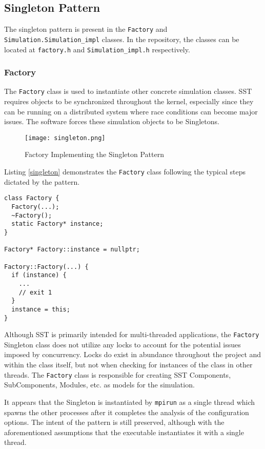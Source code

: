 \subsection{Singleton Pattern}
The singleton pattern is present in the \texttt{Factory} and \texttt{Simulation.Simulation\_impl} classes. In the repository, the classes can be located at \texttt{factory.h} and \texttt{Simulation\_impl.h} respectively.

\subsubsection{Factory}
The \texttt{Factory} class is used to instantiate other concrete simulation classes. SST requires objects to be synchronized throughout the kernel, especially since they can be running on a distributed system where race conditions can become major issues. The software forces these simulation objects to be Singletons.

\begin{figure}[ht]
  \caption{Factory Implementing the Singleton Pattern}
  \centering
  \texttt{[image: singleton.png]}
\end{figure}
\newpage

Listing \ref{singleton} demonstrates the \texttt{Factory} class following the typical steps dictated by the pattern.

\begin{lstlisting}[style=customC++,label=singleton,caption=Factory Implementing the Singleton Pattern \\ Files: src/sst/core/factory.h and src/sst/core/factory.cc]
class Factory {
  Factory(...);
  ~Factory();
  static Factory* instance;
}

Factory* Factory::instance = nullptr;

Factory::Factory(...) {
  if (instance) {
    ...
    // exit 1
  }
  instance = this;
}
\end{lstlisting}

Although SST is primarily intended for multi-threaded applications, the \texttt{Factory} Singleton class does not utilize any locks to account for the potential issues imposed by concurrency. Locks do exist in abundance throughout the project and within the class itself, but not when checking for instances of the class in other threads. The \texttt{Factory} class is responsible for creating SST Components, SubComponents, Modules, etc. as models for the simulation.

It appears that the Singleton is instantiated by \texttt{mpirun} as a single thread which spawns the other processes after it completes the analysis of the configuration options. The intent of the pattern is still preserved, although with the aforementioned assumptions that the executable instantiates it with a single thread.
\newpage

